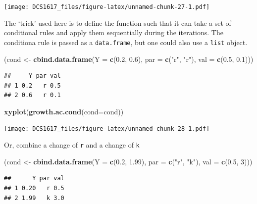\documentclass[]{book}
\newenvironment{Shaded}{\begin{snugshade}}{\end{snugshade}}
\newcommand{\KeywordTok}[1]{\textcolor[rgb]{0.13,0.29,0.53}{\textbf{{#1}}}}
\newcommand{\DataTypeTok}[1]{\textcolor[rgb]{0.13,0.29,0.53}{{#1}}}
\newcommand{\DecValTok}[1]{\textcolor[rgb]{0.00,0.00,0.81}{{#1}}}
\newcommand{\FloatTok}[1]{\textcolor[rgb]{0.00,0.00,0.81}{{#1}}}
\newcommand{\StringTok}[1]{\textcolor[rgb]{0.31,0.60,0.02}{{#1}}}
\newcommand{\NormalTok}[1]{{#1}}
\begin{document}
\texttt{[image: DCS1617\_files/figure-latex/unnamed-chunk-27-1.pdf]}

The `trick' used here is to define the function such that it can take a
set of conditional rules and apply them sequentially during the
iterations. The conditiona rule is passed as a \texttt{data.frame}, but
one could also use a \texttt{list} object.

\begin{Shaded}
\begin{Highlighting}[]
\NormalTok{(cond <-}\StringTok{ }\KeywordTok{cbind.data.frame}\NormalTok{(}\DataTypeTok{Y =} \KeywordTok{c}\NormalTok{(}\FloatTok{0.2}\NormalTok{, }\FloatTok{0.6}\NormalTok{), }\DataTypeTok{par =} \KeywordTok{c}\NormalTok{(}\StringTok{"r"}\NormalTok{, }\StringTok{"r"}\NormalTok{), }\DataTypeTok{val =} \KeywordTok{c}\NormalTok{(}\FloatTok{0.5}\NormalTok{, }\FloatTok{0.1}\NormalTok{)))}
\end{Highlighting}
\end{Shaded}

\begin{verbatim}
##     Y par val
## 1 0.2   r 0.5
## 2 0.6   r 0.1
\end{verbatim}

\begin{Shaded}
\begin{Highlighting}[]
\KeywordTok{xyplot}\NormalTok{(}\KeywordTok{growth.ac.cond}\NormalTok{(}\DataTypeTok{cond=}\NormalTok{cond))}
\end{Highlighting}
\end{Shaded}

\texttt{[image: DCS1617\_files/figure-latex/unnamed-chunk-28-1.pdf]}

Or, combine a change of \texttt{r} and a change of \texttt{k}

\begin{Shaded}
\begin{Highlighting}[]
\NormalTok{(cond <-}\StringTok{ }\KeywordTok{cbind.data.frame}\NormalTok{(}\DataTypeTok{Y =} \KeywordTok{c}\NormalTok{(}\FloatTok{0.2}\NormalTok{, }\FloatTok{1.99}\NormalTok{), }\DataTypeTok{par =} \KeywordTok{c}\NormalTok{(}\StringTok{"r"}\NormalTok{, }\StringTok{"k"}\NormalTok{), }\DataTypeTok{val =} \KeywordTok{c}\NormalTok{(}\FloatTok{0.5}\NormalTok{, }\DecValTok{3}\NormalTok{)))}
\end{Highlighting}
\end{Shaded}

\begin{verbatim}
##      Y par val
## 1 0.20   r 0.5
## 2 1.99   k 3.0
\end{verbatim}
\end{document}
